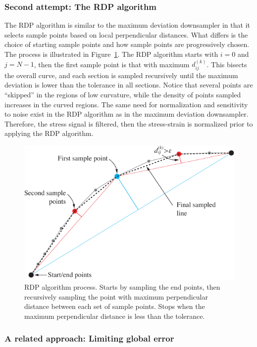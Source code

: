 \documentclass[a4paper,11pt]{article}
\begin{document}
\subsubsection{Second attempt: The RDP algorithm}

The RDP algorithm is similar to the maximum deviation downsampler in that it selects sample points based on local perpendicular distances.
What differs is the choice of starting sample points and how sample points are progressively chosen.
The process is illustrated in Figure~\ref{fig:rdp-algo}.
The RDP algorithm starts with $i = 0$ and $j = N-1$, then the first sample point is that with maximum $d^{(k)}_{ij}$.
This bisects the overall curve, and each section is sampled recursively until the maximum deviation is lower than the tolerance in all sections.
Notice that several points are ``skipped'' in the regions of low curvature, while the density of points sampled increases in the curved regions.
The same need for normalization and sensitivity to noise exist in the RDP algorithm as in the maximum deviation downsampler.
Therefore, the stress signal is filtered, then the stress-strain is normalized prior to applying the RDP algorithm.


\begin{figure}
    \centering
    \includegraphics[scale=1]{rdp_illustration.pdf}
    \caption{RDP algorithm process. Starts by sampling the end points, then recursively sampling the point with maximum perpendicular distance between each set of sample points. Stops when the maximum perpendicular distance is less than the tolerance.}
    \label{fig:rdp-algo}
\end{figure}

\subsubsection{A related approach: Limiting global error}
\end{document}
